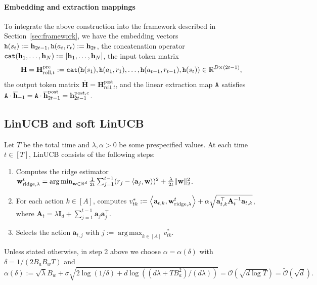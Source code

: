 \documentclass[10pt]{article}
\renewcommand{\bar}{\overline}
\newcommand{\id}{\bI}
\DeclareMathOperator*{\argmin}{arg\,min}
\DeclareMathOperator*{\argmax}{arg\,max}
\renewcommand{\cO}{\mathcal{O}}
\newcommand{\<}{\left\langle}
\renewcommand{\>}{\right\rangle}
\newcommand{\ridge}{{\rm ridge}}
\newcommand{\R}{\mathbb{R}}
\newcommand{\pre}{{\mathrm{pre}}}
\newcommand{\post}{{\mathrm{post}}}
\newcommand{\partc}{{c}}
\newcommand{\cwid}{{\alpha}}
\newcommand{\tcO}{{\tilde{\mathcal O}}}
\newcommand{\state}{{s}}
\newcommand{\action}{{a}}
\newcommand{\reward}{{r}}
\newcommand{\totlen}{{T}}
\newcommand{\cat}{{\tt cat}}
\newcommand{\extractmap}{{\tt A}}
\newcommand{\embedmap}{{\tt h}}
\newcommand{\roll}{{\mathrm{roll}}}
\def\bA{{\mathbf A}}
\def\bH{{\mathbf H}}
\def\bI{{\mathbf I}}
\def\ba{{\mathbf a}}
\def\bh{{\mathbf h}}
\def\bw{{\mathbf w}}
\begin{document}
\paragraph{Embedding and extraction mappings}
To integrate the above construction into the  framework described in Section~\ref{sec:framework},  we have the embedding vectors $\embedmap(\state_t):=\bh_{2t-1},\embedmap(\action_t,\reward_t):=\bh_{2t}$,  the concatenation operator $\cat(\bh_1, \ldots, \bh_N): = [\bh_1, \ldots, \bh_N]$, the input token matrix  $$\bH=\bH^\pre_{\roll,t}: = \cat(\embedmap(\state_1), \embedmap(\action_1, \reward_1), \ldots, \embedmap(\action_{t-1}, \reward_{t-1}), \embedmap(\state_t)) \in \R^{D \times (2t-1)},$$ the output token matrix $\bar{\bH}=\bH^\post_{\roll,t}$, and the linear extraction map $\extractmap$  satisfies $\extractmap\cdot\bar{\bh}_{-1}=\extractmap\cdot\bar{\bh}^\post_{2t-1}=\bh^{\post,\partc}_{2t-1}$. 













































\subsection{LinUCB and soft LinUCB}\label{sec:soft-LinUCB}
Let $T$ be the total time and $\lambda,\cwid>0$ be some prespecified values. At each time $t\in[T]$, LinUCB consists of the following steps: 
\begin{enumerate}
    \item Computes the ridge estimator $\bw^t_{\ridge,\lambda}=\argmin_{\bw\in\R^d}\frac{1}{2t}\sum_{j=1}^{t-1}(r_j-\<\ba_j,\bw\>)^2+\frac{\lambda}{2t}\|\bw\|_2^2$.
    \item For each action $k\in[A]$, computes $v^*_{tk}:=\<\ba_{t,k},\bw^t_{\ridge,\lambda}\>+\cwid\sqrt{\ba_{t,k}^\top \bA_{t}^{-1}  \ba_{t,k}}$, where $\bA_t=\lambda\id_d+\sum_{j=1}^{t-1}\ba_j\ba_j^\top$.
    \item Selects the action $\ba_{t,j}$ with $j:=\argmax_{k\in[A]}v^*_{tk}$.
\end{enumerate}
Unless stated otherwise, in step 2 above we choose $\alpha=\alpha(\delta)$ with $\delta=1/(2B_aB_wT)$ and $$\cwid(\delta):=\sqrt{\lambda}B_w+\sigma\sqrt{2\log(1/\delta)+d\log((d\lambda+TB_a^2)/(d\lambda))}=\cO(\sqrt{d\log \totlen})=\tcO(\sqrt{d}).$$
\end{document}
